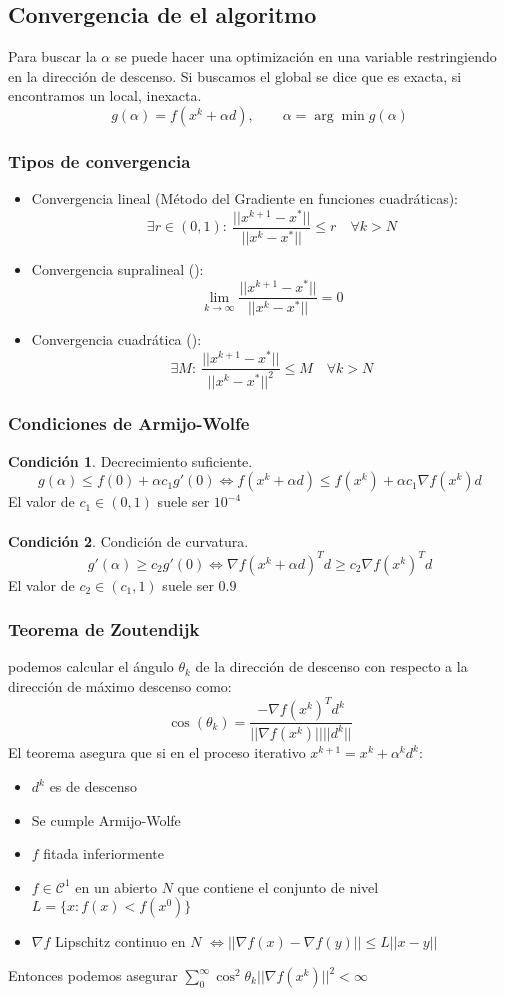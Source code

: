 \documentclass[leqno]{article}
\newcommand{\norm}[1]{\lvert \lvert #1 \rvert \rvert }
\newcommand{\N}{\nabla}
\begin{document}
\subsection{Convergencia de el algoritmo}
Para buscar la $\alpha$ se puede hacer una optimización en una variable restringiendo en la dirección de descenso. Si buscamos el global se dice que es exacta, si encontramos un local, inexacta.
$$
g(\alpha) = f(x^k + \alpha d), \qquad \alpha = \arg \min g(\alpha)
$$

\subsubsection{Tipos de convergencia}
\begin{itemize}
    \item Convergencia lineal (Método del Gradiente en funciones cuadráticas):
        $$
        \exists r\in (0, 1): \ \frac{\norm{x^{k+1} - x^*}}{\norm{x^k - x^*}}\leq r \quad \forall k>N
        $$ 
    \item Convergencia supralineal ():
        $$
        \lim_{k\to \infty} \frac{\norm{x^{k+1} - x^*}}{\norm{x^k - x^*}} = 0
        $$ 
    \item Convergencia cuadrática ():
        $$
        \exists M: \ \frac{\norm{x^{k+1} - x^*}}{\norm{x^k - x^*}^2}\leq M \quad \forall k>N
        $$ 
\end{itemize}

\subsubsection{Condiciones de Armijo-Wolfe}
\textbf{Condición 1}. Decrecimiento suficiente.
$$
g(\alpha) \leq f(0) + \alpha c_1g'(0) \iff f(x^k + \alpha d) \leq f(x^k) + \alpha c_1\N f(x^k)d
$$
El valor de $c_1 \in (0,1 )$ suele ser $10^{-4}$\\
\\
\textbf{Condición 2}. Condición de curvatura.
$$
g'(\alpha) \geq c_2g'(0) \iff \N f(x^k + \alpha d)^Td \geq c_2\N f(x^k)^Td
$$
El valor de $c_2 \in (c_1,1 )$ suele ser $0.9$

\subsubsection{Teorema de Zoutendijk}
podemos calcular el ángulo $\theta_k$ de la dirección de descenso con respecto a la dirección de máximo descenso como:
$$
\cos(\theta_k) = \frac{-\N f(x^k)^Td^k}{\norm{\N f(x^k)}\norm{d^k}}
$$
El teorema asegura que si en el proceso iterativo $x^{k+1} = x^k + \alpha^kd^k$:
\begin{itemize}
    \item $d^k$ es de descenso
    \item Se cumple Armijo-Wolfe
    \item $f$ fitada inferiormente
    \item $f\in \mathcal{C}^1$ en un abierto $N$ que contiene el conjunto de nivel $L = \{x : f(x)<f(x^0)\}$
    \item $\N f$ Lipschitz continuo en $N$ $\iff \norm{\N f(x) - \N f(y)} \leq L\norm{x-y}$
\end{itemize}
Entonces podemos asegurar $\displaystyle \sum_0^\infty \cos^2\theta_k\norm{\N f(x^k)}^2<\infty$
\end{document}
